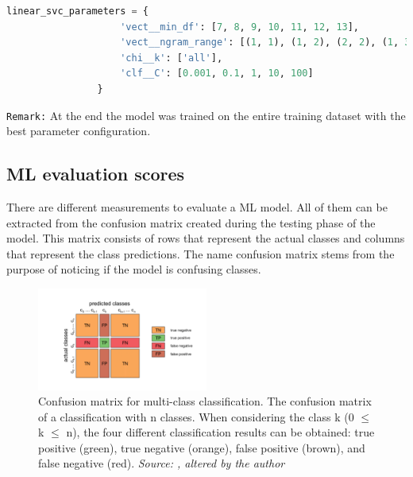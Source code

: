 \begin{lstlisting}[language=Python, caption=Tuned hyperparameters of the linearSVC fitting algorithm, label=code:linear_svc_parameters]
linear_svc_parameters = {
                    'vect__min_df': [7, 8, 9, 10, 11, 12, 13],
                    'vect__ngram_range': [(1, 1), (1, 2), (2, 2), (1, 3)],
                    'chi__k': ['all'],
                    'clf__C': [0.001, 0.1, 1, 10, 100]
                }
\end{lstlisting}

\texttt{Remark:} At the end the model was trained on the entire training dataset with the best parameter configuration.\\

\subsection{ML evaluation scores} \label{ml_evaluation_scores}
There are different measurements to evaluate a ML model. All of them can be extracted from the confusion matrix created during the testing phase of the model. This matrix consists of rows that represent the actual classes and columns that represent the class predictions. The name confusion matrix stems from the purpose of noticing if the model is confusing classes.

\begin{figure} %
    \centerline{\includegraphics[trim={0 0 0 0},clip,width=0.5\textwidth]{img/Confusion_matrix_edited}}
  \caption{Confusion matrix for multi-class classification. The confusion matrix of a classification with n classes. When considering the class k (0 $\le$ k $\le$ n), the four different classification results can be obtained: true positive (green), true negative (orange), false positive (brown), and false negative (red). \textit{Source: \parencite{Kruger2018}, altered by the author}}
  \label{fig:confusion_matrix_illustration}
\end{figure}


